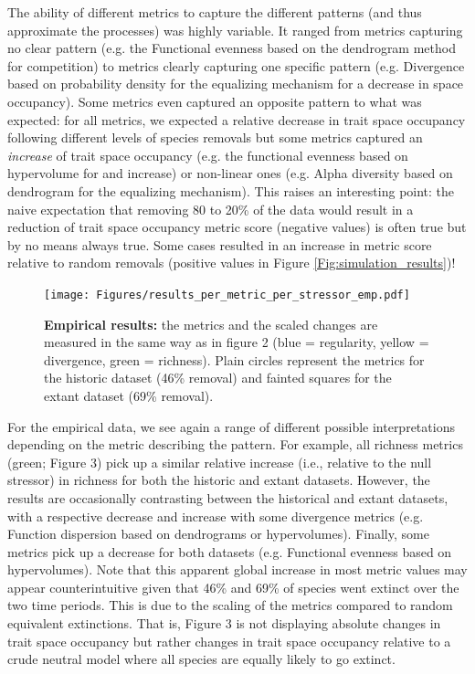 \documentclass[12pt,letterpaper]{article}
\begin{document}
The ability of different metrics to capture the different patterns (and thus approximate the processes) was highly variable.
It ranged from metrics capturing no clear pattern (e.g. the Functional evenness based on the dendrogram method for competition) to metrics clearly capturing one specific pattern (e.g. Divergence based on probability density for the equalizing mechanism for a decrease in space occupancy).
Some metrics even captured an opposite pattern to what was expected: for all metrics, we expected a relative decrease in trait space occupancy following different levels of species removals but some metrics captured an \textit{increase} of trait space occupancy (e.g. the functional evenness based on hypervolume for and increase) or non-linear ones (e.g. Alpha diversity based on dendrogram for the equalizing mechanism).
This raises an interesting point: the naive expectation that removing 80 to 20\% of the data would result in a reduction of trait space occupancy metric score (negative values) is often true but by no means always true.
Some cases resulted in an increase in metric score relative to random removals (positive values in Figure \ref{Fig:simulation_results})!

\begin{figure}[!htbp]
\centering
   \texttt{[image: Figures/results\_per\_metric\_per\_stressor\_emp.pdf]}
\caption{\scriptsize{\textbf{Empirical results:} the metrics and the scaled changes are measured in the same way as in figure 2 (blue = regularity, yellow = divergence, green = richness).
Plain circles represent the metrics for the historic dataset (46\% removal) and fainted squares for the extant dataset (69\% removal).
}}
\label{Fig:empirical_results}
\end{figure}
\bigskip

For the empirical data, we see again a range of different possible interpretations depending on the metric describing the pattern.
For example, all richness metrics (green; Figure 3) pick up a similar relative increase (i.e., relative to the null stressor) in richness for both the historic and extant datasets.
However, the results are occasionally contrasting between the historical and extant datasets, with a respective decrease and increase with some divergence metrics (e.g.
Function dispersion based on dendrograms or hypervolumes).
Finally, some metrics pick up a decrease for both datasets (e.g.
Functional evenness based on hypervolumes).
Note that this apparent global increase in most metric values may appear counterintuitive given that 46\% and 69\% of species went extinct over the two time periods.
This is due to the scaling of the metrics compared to random equivalent extinctions.
That is, Figure 3 is not displaying absolute changes in trait space occupancy but rather changes in trait space occupancy relative to a crude neutral model where all species are equally likely to go extinct.
\end{document}
